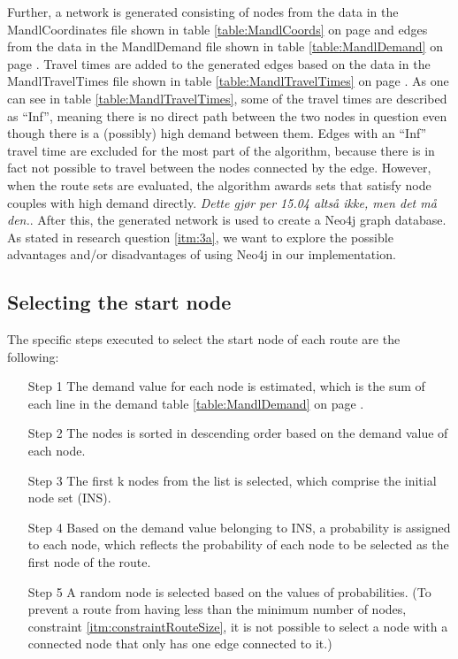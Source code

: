 Further, a network is generated consisting of nodes from the data in the MandlCoordinates file shown in table \ref{table:MandlCoords} on page \pageref{table:MandlCoords} and edges from the data in the MandlDemand file shown in table \ref{table:MandlDemand} on page \pageref{table:MandlDemand}. Travel times are added to the generated edges based on the data in the MandlTravelTimes file shown in table \ref{table:MandlTravelTimes} on page \pageref{table:MandlTravelTimes}. As one can see in table \ref{table:MandlTravelTimes}, some of the travel times are described as ``Inf'', meaning there is no direct path between the two nodes in question even though there is a (possibly) high demand between them. Edges with an ``Inf'' travel time are excluded for the most part of the algorithm, because there is in fact not possible to travel between the nodes connected by the edge. However, when the route sets are evaluated, the algorithm awards sets that satisfy node couples with high demand directly. \emph{\color{red}Dette gjør per 15.04 altså ikke, men det må den.}. After this, the generated network is used to create a Neo4j graph database. As stated in research question \ref{itm:3a}, we want to explore the possible advantages and/or disadvantages of using Neo4j in our implementation. 

\subsection{Selecting the start node}
The specific steps executed to select the start node of each route are the following:
\begin{itemize}
\item[Step 1] The demand value for each node is estimated, which is the sum of each line in the demand table \ref{table:MandlDemand} on page \pageref{table:MandlDemand}. 
\item[Step 2] The nodes is sorted in descending order based on the demand value of each node.
\item[Step 3] The first k nodes from the list is selected, which comprise the initial node set (INS). 
\item[Step 4] Based on the demand value belonging to INS, a probability is assigned to each node, which reflects the probability of each node to be selected as the first node of the route. 
\item[Step 5] A random node is selected based on the values of probabilities. (To prevent a route from having less than the minimum number of nodes, constraint \ref{itm:constraintRouteSize}, it is not possible to select a node with a connected node that only has one edge connected to it.)
\end{itemize}

